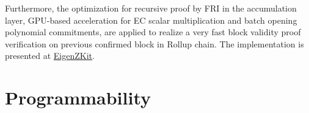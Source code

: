 \documentclass{article}
\begin{document}
Furthermore, the optimization for recursive proof by FRI in the accumulation layer, GPU-based acceleration for EC scalar multiplication and batch opening polynomial commitments, are applied to realize a very fast block validity proof verification on previous confirmed block in Rollup chain. The implementation is presented at \href{https://github.com/ieigen/EigenZKit}{EigenZKit}.

\section{Programmability}


\begin{appendices}

\end{appendices}




\end{document}
